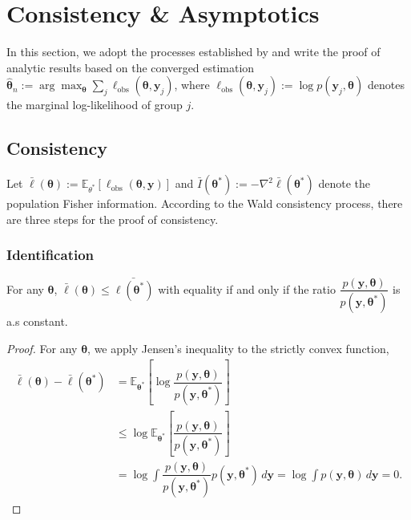 \section{Consistency \& Asymptotics}

In this section, we adopt the processes established by \citet{Cui2026} and write the proof of analytic results based on the converged estimation $\hat{\bm{\theta}}_{n}:=\arg\max_{\bm{\theta}}\sum_{j}\ell_{\text{obs}}(\bm{\theta}, \bm{y}_{j})$, where $\ell_{\text{obs}}(\bm{\theta}, \bm{y}_{j}):=\log p(\bm{y}_{j}, \bm{\theta})$ denotes the marginal log-likelihood of group $j$.

\subsection{Consistency}

Let $\bar{\ell}(\bm{\theta}):=\mathbb{E}_{\theta^{*}}[\ell_{\text{obs}}(\bm{\theta},\bm{y})]$ and $\bar{I}(\bm{\theta}^{*}):=-\nabla^{2}\bar{\ell}(\bm{\theta}^{*})$ denote the population Fisher information. According to the Wald consistency process, there are three steps for the proof of consistency.

\subsubsection{Identification}

\begin{lemma}
    For any $\bm{\theta}$, $\bar{\ell}(\bm{\theta})\leq \bar{\ell(\bm{\theta^{*}})}$ with equality if and only if the ratio $\dfrac{p(\bm{y},\bm{\theta})}{p(\bm{y},\bm{\theta}^{*})}$ is a.s  constant.
    \label{lem:identification1}
\end{lemma}

\begin{proof}
    For any $\bm{\theta}$, we apply Jensen's inequality to the strictly convex function,
    \begin{align*}
        \bar{\ell}(\bm{\theta})-\bar{\ell}(\bm{\theta}^{*})&=\mathbb{E}_{\bm{\theta}^{*}}\left[\log \dfrac{p(\bm{y},\bm{\theta})}{p(\bm{y},\bm{\theta}^{*})}\right]\\
        &\leq \log \mathbb{E}_{\bm{\theta}^{*}}\left[ \dfrac{p(\bm{y},\bm{\theta})}{p(\bm{y},\bm{\theta}^{*})}\right]\\
        &=\log \int \dfrac{p(\bm{y},\bm{\theta})}{p(\bm{y},\bm{\theta}^{*})}p(\bm{y},\bm{\theta}^{*})\,d\bm{y}=\log \int p(\bm{y},\bm{\theta})\,d\bm{y}=0.
    \end{align*}
\end{proof}

